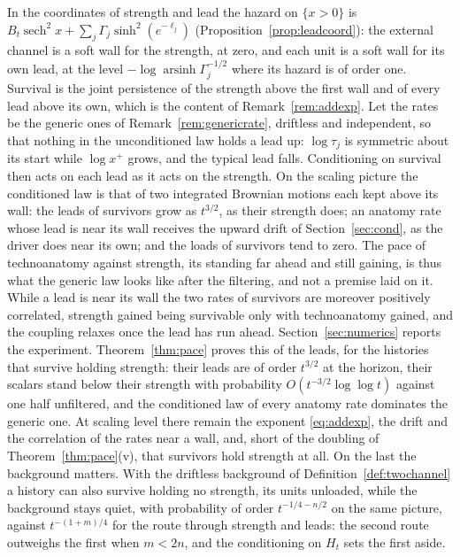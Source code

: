 \begin{remark}\label{rem:pace}
In the coordinates of strength and lead the hazard on $\{x>0\}$ is
$B_t\operatorname{sech}^2x+\sum_j\Gamma_j\sinh^2(e^{-\ell_j})$
(Proposition~\ref{prop:leadcoord}): the external channel is a soft wall
for the strength, at zero, and each unit is a soft wall for its own lead,
at the level $-\log\operatorname{arsinh}\Gamma_j^{-1/2}$ where its hazard
is of order one. Survival is the joint persistence of the strength above
the first wall and of every lead above its own, which is the content of
Remark~\ref{rem:addexp}. Let the rates be the generic ones of
Remark~\ref{rem:genericrate}, driftless and independent, so that nothing
in the unconditioned law holds a lead up: $\log\tau_j$ is symmetric about
its start while $\log x^+$ grows, and the typical lead falls.
Conditioning on survival then acts on each lead as it acts on the
strength. On the scaling picture the conditioned law is that of two
integrated Brownian motions each kept above its wall: the leads of
survivors grow as $t^{3/2}$, as their strength does; an anatomy rate whose
lead is near its wall receives the upward drift of
Section~\ref{sec:cond}, as the driver does near its own; and the loads of
survivors tend to zero. The pace of technoanatomy against strength, its
standing far ahead and still gaining, is thus what the generic law looks
like after the filtering, and not a premise laid on it. While a lead is
near its wall the two rates of survivors are moreover positively
correlated, strength gained being survivable only with technoanatomy
gained, and the coupling relaxes once the lead has run ahead.
Section~\ref{sec:numerics} reports the experiment.
Theorem~\ref{thm:pace} proves this of the leads, for the histories that
survive holding strength: their leads are of order $t^{3/2}$ at the
horizon, their scalars stand below their strength with probability
$O(t^{-3/2}\log\log t)$ against one half unfiltered, and the conditioned
law of every anatomy rate dominates the generic one. At scaling level
there remain the exponent \eqref{eq:addexp}, the drift and the
correlation of the rates near a wall, and, short of the doubling of
Theorem~\ref{thm:pace}(v), that survivors hold strength at all. On the
last the background matters. With the driftless background of
Definition~\ref{def:twochannel} a history can also survive holding no
strength, its units unloaded, while the background stays quiet, with
probability of order $t^{-1/4-n/2}$ on the same picture, against
$t^{-(1+m)/4}$ for the route through strength and leads: the second route
outweighs the first when $m<2n$, and the conditioning on $H_t$ sets the
first aside.
\end{remark}
